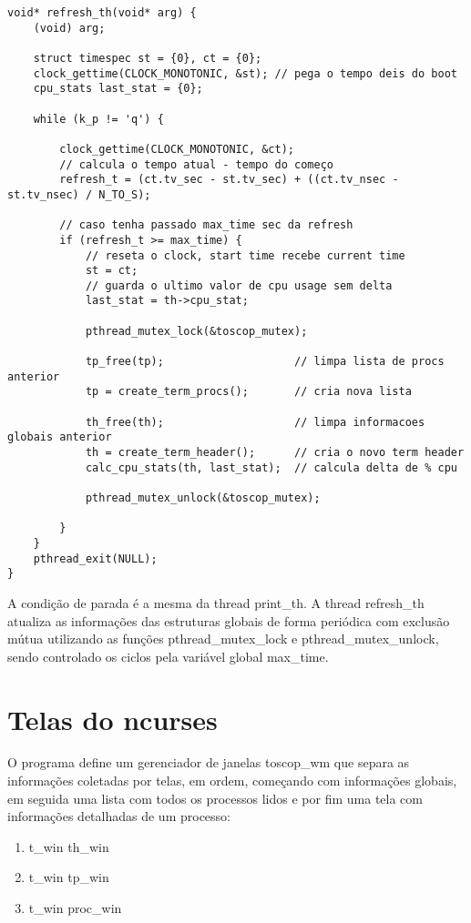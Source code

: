 \documentclass{article}
\begin{document}
\begin{verbatim}
void* refresh_th(void* arg) {
    (void) arg; 
    
    struct timespec st = {0}, ct = {0};
    clock_gettime(CLOCK_MONOTONIC, &st); // pega o tempo deis do boot 
    cpu_stats last_stat = {0}; 
 
    while (k_p != 'q') {

        clock_gettime(CLOCK_MONOTONIC, &ct); 
        // calcula o tempo atual - tempo do começo
        refresh_t = (ct.tv_sec - st.tv_sec) + ((ct.tv_nsec - st.tv_nsec) / N_TO_S); 

        // caso tenha passado max_time sec da refresh 
        if (refresh_t >= max_time) {
            // reseta o clock, start time recebe current time
            st = ct;                  
            // guarda o ultimo valor de cpu usage sem delta
            last_stat = th->cpu_stat; 
      
            pthread_mutex_lock(&toscop_mutex);

            tp_free(tp);                    // limpa lista de procs anterior
            tp = create_term_procs();       // cria nova lista
          
            th_free(th);                    // limpa informacoes globais anterior
            th = create_term_header();      // cria o novo term header
            calc_cpu_stats(th, last_stat);  // calcula delta de % cpu
           
            pthread_mutex_unlock(&toscop_mutex);
        
        }
    } 
    pthread_exit(NULL);
}
\end{verbatim}

A condição de parada é a mesma da thread print\_th. A thread refresh\_th atualiza
as informações das estruturas globais de forma periódica com exclusão mútua
utilizando as funções pthread\_mutex\_lock e pthread\_mutex\_unlock,
sendo controlado os ciclos pela variável global max\_time.

\section{Telas do ncurses}
O programa define um gerenciador de janelas toscop\_wm que 
separa as informações coletadas por telas, em ordem, começando
com informações globais, em seguida uma lista com todos os processos lidos e
por fim uma tela com informações detalhadas de um processo:
\begin{enumerate}
    \item t\_win th\_win 
    \item t\_win tp\_win  
    \item t\_win proc\_win 
\end{enumerate}
\end{document}
